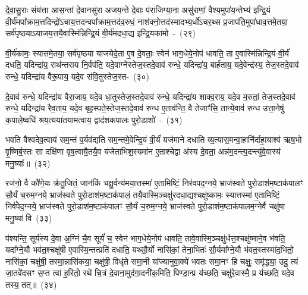 {\anuvakamend[{पु॒रो॒डाश॒न्त्रयः॒ षड्विꣳ॑शतिश्च}]}%

दे॒वा॒सु॒राः संय॑त्ता आस॒न्तां दे॒वानसु॑रा अजय॒न्ते दे॒वाः प॑राजिग्या॒ना असु॑राणां॒ वैश्य॒मुपा॑य॒न्तेभ्य॑ इन्द्रि॒यं वी॒र्य॑मपा᳚\-क्राम॒त्तदिन्द्रो॑\-ऽचाय॒त्तदन्वपा᳚\-क्राम॒त्तद॑व॒रुधं॒ नाश॑क्नो॒त्तद॑स्मा\-दभ्य॒र्धो॑\-ऽचर॒थ्स प्र॒जा\-प॑ति॒मुपा॑धाव॒त्तमे॒तया॒ सर्व॑पृष्ठया\-ऽयाजय॒त्त\-यै॒वास्मि॑न्निन्द्रि॒यं वी॒र्य॑मदधा॒द्य इ॑न्द्रि॒यका॑मो~-~(२९)

वी॒र्य॑कामः॒ स्यात्तमे॒तया॒ सर्व॑पृष्ठया याजयेदे॒ता ए॒व दे॒वताः॒ स्वेन॑ भाग॒धेये॒नोप॑ धावति॒ ता ए॒वास्मि॑न्निन्द्रि॒यं वी॒र्यं॑ दधति॒ यदिन्द्रा॑य॒ राथ॑न्तराय नि॒र्वप॑ति॒ यदे॒वाग्नेस्तेज॒स्तदे॒वाव॑ रुन्धे॒ यदिन्द्रा॑य॒ बार्\mbox{}ह॑ताय॒ यदे॒वेन्द्र॑स्य॒ तेज॒स्तदे॒वाव॑ रुन्धे॒ यदिन्द्रा॑य वैरू॒पाय॒ यदे॒व स॑वि॒तुस्तेज॒स्त-~(३०)

दे॒वाव॑ रुन्धे॒ यदिन्द्रा॑य वैरा॒जाय॒ यदे॒व धा॒तुस्तेज॒स्तदे॒वाव॑ रुन्धे॒ यदिन्द्रा॑य शाक्व॒राय॒ यदे॒व म॒रुतां॒ तेज॒स्तदे॒वाव॑ रुन्धे॒ यदिन्द्रा॑य रैव॒ताय॒ यदे॒व बृह॒स्पते॒स्तेज॒स्तदे॒वाव॑ रुन्ध ए॒ताव॑न्ति॒ वै तेजाꣳ॑सि॒ तान्ये॒वाव॑ रुन्ध उत्ता॒नेषु॑ क॒पाले॒ष्वधि॑ श्रय॒त्यया॑तयामत्वाय॒ द्वाद॑श\-कपालः पुरो॒डाशो॑~-~(३१)

भवति वैश्वदेव॒त्वाय॑ सम॒न्तं प॒र्यव॑द्यति सम॒न्तमे॒वेन्द्रि॒यं वी॒र्यं॑ यज॑माने दधाति व्य॒त्यास॒मन्वा॒हानि॑र्दाहा॒याश्व॑ ऋष॒भो वृ॒ष्णिर्ब॒स्तः सा दक्षि॑णा वृष॒त्वायै॒तयै॒व य॑जेताभिश॒स्यमा॑न ए॒ताश्चेद्वा अ॑स्य दे॒वता॒ अन्न॑म॒दन्त्य॒दन्त्यु॑वे॒वास्य॑ मनु॒ष्याः᳚॥~(३२)

{\anuvakamend[{इ॒न्द्रि॒यका॑मः सवि॒तुस्तेज॒स्तत्पु॑रो॒डाशो॒\-ऽष्टात्रिꣳ॑शच्च}]}%

रज॑नो॒ वै कौ॑णे॒यः क्र॑तु॒जितं॒ जान॑किं चक्षु॒र्वन्य॑मया॒त्तस्मा॑ ए॒तामिष्टिं॒ निर॑वपद॒ग्नये॒ भ्राज॑स्वते पुरो॒डाश॑\-म॒ष्टाक॑पालꣳ सौ॒र्यं च॒रुम॒ग्नये॒ भ्राज॑स्वते पुरो॒डाश॑\-म॒ष्टाक॑पालं॒ तयै॒वास्मि॒ञ्चक्षु॑\-र\-दधा॒द्यश्चक्षु॑ष्कामः॒ स्यात्तस्मा॑ ए॒तामिष्टिं॒ निर्व॑पेद॒ग्नये॒ भ्राज॑स्वते पुरो॒डाश॑\-म॒ष्टाक॑पालꣳ सौ॒र्यं च॒रुम॒ग्नये॒ भ्राज॑स्वते पुरो॒डाश॑\-म॒ष्टाक॑पालम॒ग्नेर्वै चक्षु॑षा मनु॒ष्या॑ वि~(३३)

प॑श्यन्ति॒ सूर्य॑स्य दे॒वा अ॒ग्निं चै॒व सूर्यं॑ च॒ स्वेन॑ भाग॒धेये॒नोप॑ धावति॒ तावे॒वास्मि॒ञ्चक्षु॑र्धत्त॒श्चक्षु॑ष्माने॒व भ॑वति॒ यदा᳚ग्ने॒यौ भव॑त॒श्चक्षु॑षी ए॒वास्मि॒न्तत्प्रति॑ दधाति॒ यथ्सौ॒र्यो नासि॑कां॒ तेना॒भितः॑ सौ॒र्यमा᳚ग्ने॒यौ भ॑वत॒स्तस्मा॑द॒भितो॒ नासि॑कां॒ चक्षु॑षी॒ तस्मा॒न्नासि॑कया॒ चक्षु॑षी॒ विधृ॑ते समा॒नी या᳚ज्यानुवा॒क्ये॑ भवतः समा॒नꣳ हि चक्षुः॒ समृ॑द्ध्या॒ उदु॒ त्यं जा॒तवे॑दसꣳ स॒प्त त्वा॑ ह॒रितो॒ रथे॑ चि॒त्रं दे॒वाना॒मुद॑गा॒दनी॑क॒मिति॒ पिण्डा॒न्प्र य॑च्छति॒ चक्षु॑रे॒वास्मै॒ प्र य॑च्छति॒ यदे॒व तस्य॒ तत्॥~(३४)

